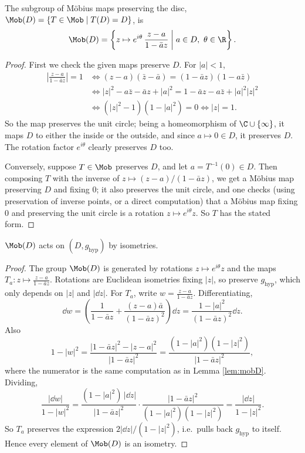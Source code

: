 \begin{lemma}\label{lem:mobD}
    The subgroup of M\"obius maps preserving the disc, $\Mob(D) = \{T \in \Mob \mid T(D) = D\}$, is
    $$
    \Mob(D) = \left\{z \mapsto e^{i\theta}\, \frac{z - a}{1 - \bar{a} z} \;\middle|\; a \in D,\ \theta \in \R \right\}.
    $$
\end{lemma}
\begin{proof}
    First we check the given maps preserve $D$. For $|a| < 1$,
    \begin{align*}
        \left|\frac{z - a}{1 - \bar a z}\right| = 1 &\iff (z - a)(\bar z - \bar a) = (1 - \bar a z)(1 - a \bar z) \\
        &\iff |z|^2 - a \bar z - \bar a z + |a|^2 = 1 - \bar a z - a \bar z + |a|^2 |z|^2 \\
        &\iff (|z|^2 - 1)(1 - |a|^2) = 0 \iff |z| = 1.
    \end{align*}
    So the map preserves the unit circle; being a homeomorphism of $\C \cup \{\infty\}$, it maps $D$ to either the inside or the outside, and since $a \mapsto 0 \in D$, it preserves $D$. The rotation factor $e^{i\theta}$ clearly preserves $D$ too.

    Conversely, suppose $T \in \Mob$ preserves $D$, and let $a = T^{-1}(0) \in D$. Then composing $T$ with the inverse of $z \mapsto (z - a)/(1 - \bar a z)$, we get a M\"obius map preserving $D$ and fixing $0$; it also preserves the unit circle, and one checks (using preservation of inverse points, or a direct computation) that a M\"obius map fixing $0$ and preserving the unit circle is a rotation $z \mapsto e^{i\theta} z$. So $T$ has the stated form.
\end{proof}

\begin{lemma}\label{lem:mobisometry}
    $\Mob(D)$ acts on $(D, g_{\mathrm{hyp}})$ by isometries.
\end{lemma}
\begin{proof}
    The group $\Mob(D)$ is generated by rotations $z \mapsto e^{i\theta} z$ and the maps $T_a: z \mapsto \frac{z-a}{1 - \bar a z}$. Rotations are Euclidean isometries fixing $|z|$, so preserve $g_{\mathrm{hyp}}$, which only depends on $|z|$ and $|\dd z|$.
    For $T_a$, write $w = \frac{z - a}{1 - \bar a z}$. Differentiating,
    $$
    \dd w = \left(\frac{1}{1 - \bar a z} + \frac{(z - a)\bar a}{(1 - \bar a z)^2}\right) \dd z = \frac{1 - |a|^2}{(1 - \bar a z)^2} \dd z.
    $$
    Also
    $$
    1 - |w|^2 = \frac{|1 - \bar a z|^2 - |z - a|^2}{|1 - \bar a z|^2} = \frac{(1 - |a|^2)(1 - |z|^2)}{|1 - \bar a z|^2},
    $$
    where the numerator is the same computation as in Lemma \ref{lem:mobD}. Dividing,
    $$
    \frac{|\dd w|}{1 - |w|^2} = \frac{(1 - |a|^2)\,|\dd z|}{|1 - \bar a z|^2} \cdot \frac{|1 - \bar a z|^2}{(1 - |a|^2)(1 - |z|^2)} = \frac{|\dd z|}{1 - |z|^2}.
    $$
    So $T_a$ preserves the expression $2|\dd z|/(1 - |z|^2)$, i.e.\ pulls back $g_{\mathrm{hyp}}$ to itself. Hence every element of $\Mob(D)$ is an isometry.
\end{proof}

